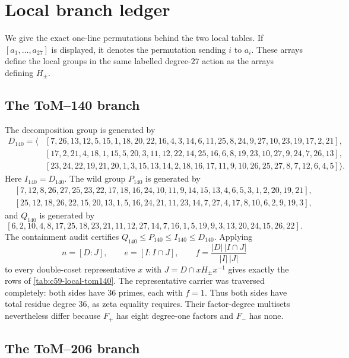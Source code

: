 \section{Local branch ledger}
\label{app:local-ledger}

We give the exact one-line permutations behind the two local tables.  If
$[a_1,\ldots,a_{27}]$ is displayed, it denotes the permutation sending
$i$ to $a_i$.  These arrays define the local groups in the same labelled
degree-$27$ action as the arrays defining $H_\pm$.

\subsection{The ToM--140 branch}

The decomposition group is generated by
\begin{align*}
D_{140}=\langle
&[7,26,13,12,5,15,1,18,20,22,16,4,3,14,6,11,25,8,24,9,27,10,23,19,17,2,21],\\
&[17,2,21,4,18,1,15,5,20,3,11,12,22,14,25,16,6,8,19,23,10,27,9,24,7,26,13],\\
&[23,24,22,19,21,20,1,3,15,13,14,2,18,16,17,11,9,10,26,25,27,8,7,12,6,4,5]
\rangle .
\end{align*}
Here $I_{140}=D_{140}$.  The wild group $P_{140}$ is generated by
\begin{align*}
&[7,12,8,26,27,25,23,22,17,18,16,24,10,11,9,14,15,13,4,6,5,3,1,2,20,19,21],\\
&[25,12,18,26,22,15,20,13,1,5,16,24,21,11,23,14,7,27,4,17,8,10,6,2,9,19,3],
\end{align*}
and $Q_{140}$ is generated by
\[
[6,2,10,4,8,17,25,18,23,21,11,12,27,14,7,16,1,5,19,9,3,13,20,24,15,26,22].
\]
The containment audit certifies $Q_{140}\le P_{140}\le I_{140}\le
D_{140}$.  Applying
\[
 n=[D:J],\qquad e=[I:I\cap J],\qquad
 f=\frac{|D|\,|I\cap J|}{|I|\,|J|}
\]
to every double-coset representative $x$ with $J=D\cap xH_\pm x^{-1}$
gives exactly the rows of \cref{tab:c59-local-tom140}.  The representative
carrier was traversed completely: both sides have $36$ primes, each with
$f=1$.  Thus both sides have total residue degree $36$, as zeta equality
requires.  Their factor-degree multisets nevertheless differ because
$F_+$ has eight degree-one factors and $F_-$ has none.

\subsection{The ToM--206 branch}

